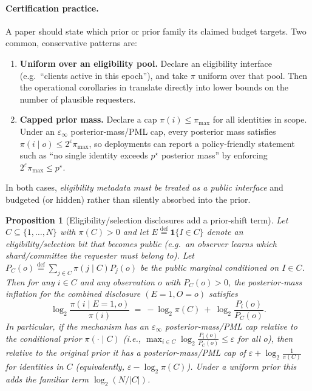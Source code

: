 \documentclass[11pt]{article}
\newcommand{\one}{\mathbf{1}}
\newcommand{\defeq}{\stackrel{\mathrm{def}}{=}}
\newtheorem{proposition}{Proposition}
\theoremstyle{definition}
\theoremstyle{remark}
\begin{document}
\paragraph{Certification practice.}
A paper should state which prior or prior family its claimed budget targets.
Two common, conservative patterns are:
\begin{enumerate}[leftmargin=*]
\item \textbf{Uniform over an eligibility pool.} Declare an eligibility interface (e.g.\ ``clients active in this epoch''), and take $\pi$ uniform over that pool.
Then the operational corollaries in  translate directly into lower bounds on the number of plausible requesters.
\item \textbf{Capped prior mass.} Declare a cap $\pi(i)\le \pi_{\max}$ for all identities in scope.
Under an $\varepsilon_\infty$ posterior-mass/PML cap, every posterior mass satisfies $\pi(i\mid o)\le 2^{\varepsilon}\pi_{\max}$, so deployments can report a policy-friendly statement such as ``no single identity exceeds $p^\star$ posterior mass'' by enforcing $2^{\varepsilon}\pi_{\max}\le p^\star$.
\end{enumerate}
In both cases, \emph{eligibility metadata must be treated as a public interface} and budgeted (or hidden) rather than silently absorbed into the prior.

\begin{proposition}[Eligibility/selection disclosures add a prior-shift term]\label{prop:selection}
Let $C\subseteq\{1,\dots,N\}$ with $\pi(C)>0$ and let $E\defeq\one\{I\in C\}$ denote an eligibility/selection bit that becomes public (e.g.\ an observer learns which shard/committee the requester must belong to).
Let $P_C(o)\defeq\sum_{j\in C}\pi(j\mid C)P_j(o)$ be the public marginal conditioned on $I\in C$.
Then for any $i\in C$ and any observation $o$ with $P_C(o)>0$, the posterior-mass inflation for the combined disclosure $(E{=}1,O{=}o)$ satisfies
\[
\log_2\frac{\pi(i\mid E{=}1,o)}{\pi(i)}\ =\ -\log_2 \pi(C)\ +\ \log_2\frac{P_i(o)}{P_C(o)}.
\]
In particular, if the mechanism has an $\varepsilon_\infty$ posterior-mass/PML cap relative to the conditional prior $\pi(\cdot\mid C)$ (i.e., $\max_{i\in C}\log_2\tfrac{P_i(o)}{P_C(o)}\le\varepsilon$ for all $o$), then relative to the original prior it has a posterior-mass/PML cap of $\varepsilon+\log_2\tfrac{1}{\pi(C)}$ for identities in $C$ (equivalently, $\varepsilon-\log_2\pi(C)$).
Under a uniform prior this adds the familiar term $\log_2(N/|C|)$.
\end{proposition}
\end{document}
